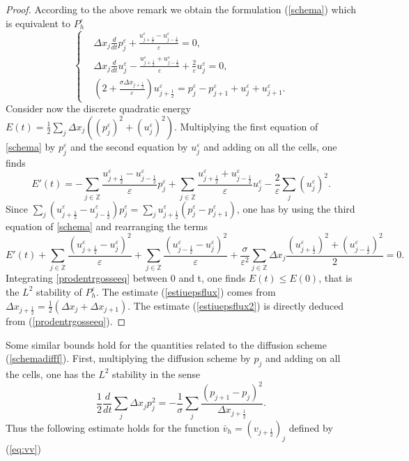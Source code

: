 \documentclass[a4paper,french,english,10pt]{article}
\newcommand\eps{\varepsilon}
\begin{document}
\begin{proof}
According to the above remark we obtain  
the formulation 
(\ref{schema}) 
which is 
equivalent to $P_h^\eps$
\begin{equation}\label{schema}
\left\{
\begin{aligned}
&\Delta x_j\frac{d}{dt}p^{\eps}_j +\frac{u_{j+\frac12 }^{\eps} -
u_{j-\frac12 }^{\eps} }{\eps} = 0,\\
&\Delta x_j\frac{d}{dt}u^{\eps}_j-\frac{u_{j+\frac12 }^{\eps}+
u_{j-\frac12 }^{\eps}}{\eps} +\frac{2}{\eps}u_j^{\eps}=0, \\
&
\left( 2
+\frac{\sigma \Delta x_{j+\frac12}
 }{\eps}
\right) u_{j+\frac12 }^{\eps} 
=p^{\eps}_j-p^{\eps}_{j+1}+u^{\eps}_j+u^{\eps}_{j+1}
.
\end{aligned}
\right.
\end{equation}
Consider now the discrete quadratic energy
$E(t)=\frac12 \sum_j \Delta x_j ((p^{\eps}_j)^2+(u^{\eps}_j)^2)$.
 Multiplying the first equation of \eqref{schema} by $p_j^{\eps}$ and the second
equation by $u_j^{\eps}$ and adding on all the cells, one finds
\begin{equation*}
 E'(t)=-\sum_{j\in \mathbb{Z}} \frac{
u_{j+\frac12 }^{\eps}-u_{j-\frac12 }^{\eps}}{\eps}p^{\eps}_j + \sum_{j\in
\mathbb{Z}} \frac{
u_{j+\frac12 }^{\eps}+u_{j-\frac12 }^{\eps}}{\eps}u^{\eps}_j
-\frac{2}{\eps}\sum_j (u^{\eps}_j)^2.
\end{equation*}
Since $
\sum_{j}(
u_{j+\frac12 }^{\eps}-u_{j-\frac12 }^{\eps})p^{\eps}_j =
\sum_{j} u_{j+\frac12 }^{\eps}(p^{\eps}_j-p^{\eps}_{j+1})$, one
has  by using the third equation of \eqref{schema} and rearranging the
terms
\begin{equation}\label{prodentrgosseeq}
E'(t)+\sum_{j\in \mathbb{Z}} \frac{
(u_{j+\frac12 }^{\eps}-u^{\eps}_j)^2 }{\eps}+\sum_{j\in \mathbb{Z}} \frac{
(u_{j-\frac12 }^{\eps}-u^{\eps}_j)^2 }{\eps} +
\frac{\sigma}{\eps^2}\sum_{j\in \mathbb{Z}} \Delta x_{j}
\frac{(u_{j+\frac12 }^{\eps})^2+(u_{j-\frac12 }^{\eps})^2}{2}= 0.
\end{equation}
Integrating  \eqref{prodentrgosseeq} between 0 and t, one finds  $E(t)\leq E(0)$, that is the $L^2$ stability of $P_h^\eps$.
The estimate  (\ref{estiuepsflux}) 
comes from 
$\Delta x_{j+\frac12}=\frac12( \Delta x_{j}+\Delta x_{j+1})$. The estimate 
 (\ref{estiuepsflux2}) is directly deduced from
(\ref{prodentrgosseeq}).
\end{proof}


Some similar bounds hold 
for  the quantities related to the diffusion scheme (\ref{schemadifff}).
First, multiplying the diffusion scheme by $p_j$ and adding on all the cells,
one has the $L^2$ stability in the sense
\begin{equation*}
\frac12 \frac{d}{dt}\sum_j \Delta x_jp_j^2=-\frac{1}{\sigma}\sum_j
\frac{(p_{j+1}-p_j)^2}{\Delta x_{j+\frac12 }}.
\end{equation*}
Thus 
the following estimate holds for
 the function 
$\bar{v}_h=\left( v_{j+\frac12}  \right)_j$ defined by
(\ref{eq:vv})  
 
\end{document}
